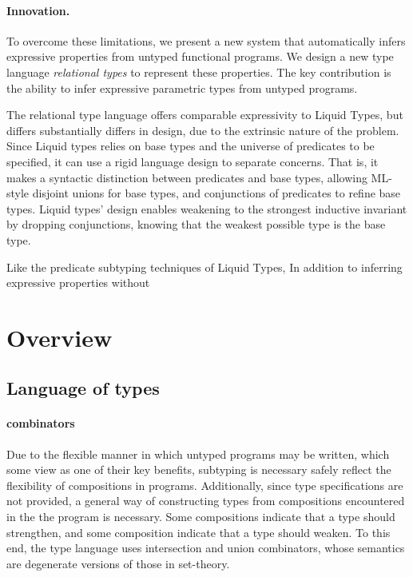 \documentclass[letterpaper]{llncs}
\begin{document}
\paragraph{Innovation.} 
To overcome these limitations, we present a new system that automatically infers expressive properties 
from untyped functional programs. 
We design a new type language \textit{relational types} to represent these properties.
The key contribution is the ability to infer expressive parametric types from untyped programs.





The relational type language offers comparable expressivity to Liquid Types, but differs substantially differs in design,
due to the extrinsic nature of the problem.
Since Liquid types relies on base types and the universe of predicates to be specified, 
it can use a rigid language design to separate concerns. That is, it makes a syntactic distinction
between predicates and base types, allowing ML-style disjoint unions for base types, 
and conjunctions of predicates to refine base types. Liquid types' design enables  
weakening to the strongest inductive invariant by dropping conjunctions, 
knowing that the weakest possible type is the base type.


Like the predicate subtyping techniques of Liquid Types, 
In addition to inferring expressive properties without

\section{Overview}

\subsection{Language of types}

\paragraph{combinators}
Due to the flexible manner in which untyped programs may be written, 
which some view as one of their key benefits, subtyping is necessary
safely reflect the flexibility of compositions in programs.
Additionally, since type specifications are not provided, 
a general way of constructing types from compositions 
encountered in the the program is necessary.
Some compositions indicate that a type should strengthen, 
and some composition indicate that a type should weaken.
To this end, the type language uses intersection and union combinators,
whose semantics are degenerate versions of those in set-theory.
\end{document}
